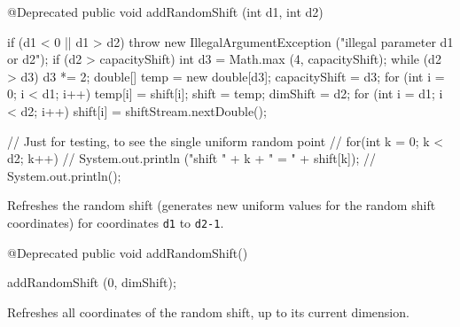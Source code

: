 \begin{hide}
\begin{code}

   @Deprecated
   public void addRandomShift (int d1, int d2)\begin{hide} {
      if (d1 < 0 || d1 > d2)
         throw new IllegalArgumentException ("illegal parameter d1 or d2");
      if (d2 > capacityShift) {
         int d3 = Math.max (4, capacityShift);
         while (d2 > d3)
            d3 *= 2;
         double[] temp = new double[d3];
         capacityShift = d3;
         for (int i = 0; i < d1; i++)
            temp[i] = shift[i];
         shift = temp;
      }
      dimShift = d2;
      for (int i = d1; i < d2; i++)
         shift[i] = shiftStream.nextDouble();

 // Just for testing, to see the single uniform random point
 //     for(int k = 0; k < d2; k++)
 //       System.out.println ("shift " + k + " = " + shift[k]);
 //     System.out.println();

   }\end{hide}
\end{code}
 \begin{tabb}
  Refreshes the random shift (generates new uniform values for the
  random shift coordinates) for coordinates \texttt{d1} to \texttt{d2-1}.
 \end{tabb}
\begin{code}

   @Deprecated
   public void addRandomShift() \begin{hide} {
      addRandomShift (0, dimShift);
   }\end{hide}
\end{code}
 \begin{tabb}
  Refreshes all coordinates of the random shift, up to its current dimension.
 \end{tabb}
\end{hide}
